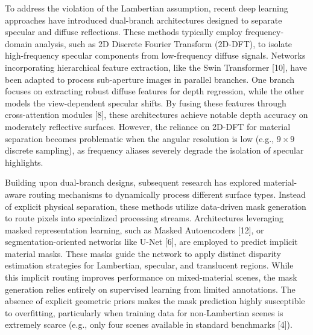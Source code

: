 To address the violation of the Lambertian assumption, recent deep learning approaches have introduced dual-branch architectures designed to separate specular and diffuse reflections. These methods typically employ frequency-domain analysis, such as 2D Discrete Fourier Transform (2D-DFT), to isolate high-frequency specular components from low-frequency diffuse signals. Networks incorporating hierarchical feature extraction, like the Swin Transformer [10], have been adapted to process sub-aperture images in parallel branches. One branch focuses on extracting robust diffuse features for depth regression, while the other models the view-dependent specular shifts. By fusing these features through cross-attention modules [8], these architectures achieve notable depth accuracy on moderately reflective surfaces. However, the reliance on 2D-DFT for material separation becomes problematic when the angular resolution is low (e.g., $9 \times 9$ discrete sampling), as frequency aliases severely degrade the isolation of specular highlights.

Building upon dual-branch designs, subsequent research has explored material-aware routing mechanisms to dynamically process different surface types. Instead of explicit physical separation, these methods utilize data-driven mask generation to route pixels into specialized processing streams. Architectures leveraging masked representation learning, such as Masked Autoencoders [12], or segmentation-oriented networks like U-Net [6], are employed to predict implicit material masks. These masks guide the network to apply distinct disparity estimation strategies for Lambertian, specular, and translucent regions. While this implicit routing improves performance on mixed-material scenes, the mask generation relies entirely on supervised learning from limited annotations. The absence of explicit geometric priors makes the mask prediction highly susceptible to overfitting, particularly when training data for non-Lambertian scenes is extremely scarce (e.g., only four scenes available in standard benchmarks [4]).

